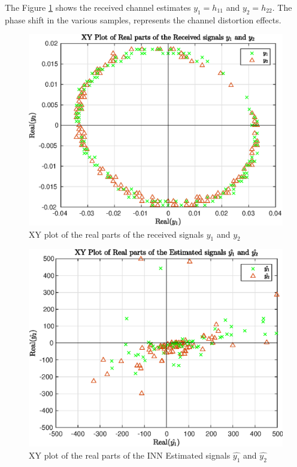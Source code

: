The Figure \ref{fig:INNyn} shows the received channel estimates $y_1 = h_{11}$ and $y_2 = h_{22}$. The phase shift in the various samples, represents the channel distortion effects.

\begin{figure}[!htb]
    \centering
    \includegraphics[width=\linewidth]{images/INNyn.eps}
    \caption{XY plot of the real parts of the received signals $y_1$ and $y_2$}
    \label{fig:INNyn}
\end{figure}

\begin{figure}[!htb]
    \centering
    \includegraphics[width=\linewidth]{images/INNResult.eps}
    \caption{XY plot of the real parts of the INN Estimated signals $\hat{y_1}$ and $\hat{y_2}$ }
    \label{fig:INNyResult}
\end{figure}
